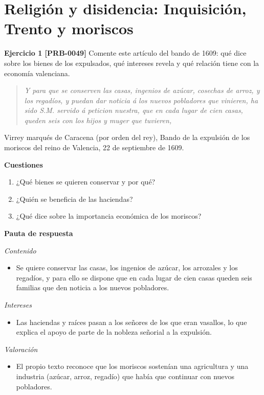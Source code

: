 \documentclass{book}
\begin{document}
\section{Religión y disidencia: Inquisición, Trento y moriscos}

\noindent\textbf{Ejercicio 1 [PRB-0049]}
Comente este artículo del bando de 1609: qué dice sobre los bienes de los expulsados, qué intereses revela y qué relación tiene con la economía valenciana.


\begin{quote}
\itshape Y para que se conserven las casas, ingenios de azúcar, cosechas de arroz, y los regadíos, y puedan dar noticia á los nuevos pobladores que vinieren, ha sido S.M. servido á peticion nuestra, que en cada lugar de cien casas, queden seis con los hijos y muger que tuvieren,
\end{quote}
{\noindent\footnotesize Virrey marqués de Caracena (por orden del rey), Bando de la expulsión de los moriscos del reino de Valencia, 22 de septiembre de 1609.\par}

\noindent\textbf{Cuestiones}
\begin{enumerate}
\item ¿Qué bienes se quieren conservar y por qué?
\item ¿Quién se beneficia de las haciendas?
\item ¿Qué dice sobre la importancia económica de los moriscos?
\end{enumerate}

\noindent\textbf{Pauta de respuesta}

\noindent\textit{Contenido}
\begin{itemize}
\item Se quiere conservar las casas, los ingenios de azúcar, los arrozales y los regadíos, y para ello se dispone que en cada lugar de cien casas queden seis familias que den noticia a los nuevos pobladores.
\end{itemize}

\noindent\textit{Intereses}
\begin{itemize}
\item Las haciendas y raíces pasan a los señores de los que eran vasallos, lo que explica el apoyo de parte de la nobleza señorial a la expulsión.
\end{itemize}

\noindent\textit{Valoración}
\begin{itemize}
\item El propio texto reconoce que los moriscos sostenían una agricultura y una industria (azúcar, arroz, regadío) que había que continuar con nuevos pobladores.
\end{itemize}
\end{document}
